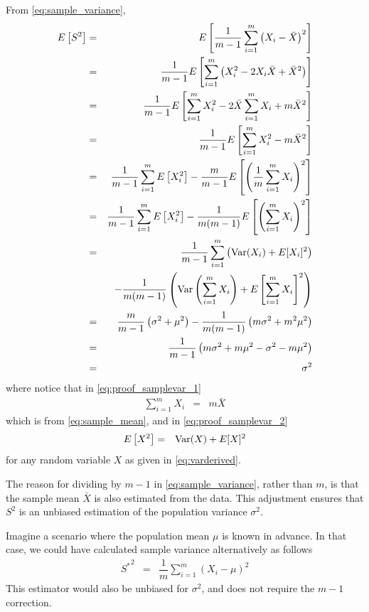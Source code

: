 From \eqref{eq:sample_variance},
\begin{eqnarray}
	E\left[S^2\right] &=& E\left[\dfrac{1}{m-1}\sum_{i=1}^{m}\left(X_i - \bar{X}\right)^2\right] \nonumber \\
	&=& \dfrac{1}{m-1} E\left[\sum_{i=1}^{m}\left(X_i^2 - 2X_i\bar{X} + \bar{X}^2\right)\right]  \nonumber \\
	&=& \dfrac{1}{m-1} E\left[\sum_{i=1}^{m}X_i^2 - 2\bar{X}\sum_{i=1}^{m}X_i + m\bar{X}^2\right] \label{eq:proof_samplevar_1} \\
	&=& \dfrac{1}{m-1} E\left[\sum_{i=1}^{m}X_i^2 - m\bar{X}^2\right] \nonumber \\
	&=& \dfrac{1}{m-1}\sum_{i=1}^{m} E\left[X_i^2\right] - \dfrac{m}{m-1}E\left[\left(\dfrac{1}{m}\sum_{i=1}^{m}X_i\right)^2\right] \nonumber \\
	&=& \dfrac{1}{m-1}\sum_{i=1}^{m} E\left[X_i^2\right] - \dfrac{1}{m(m-1)}E\left[\left(\sum_{i=1}^{m}X_i\right)^2\right] \label{eq:proof_samplevar_2} \\
	&=& \dfrac{1}{m-1}\sum_{i=1}^{m} \left(\textup{Var}(X_i) + E[X_i]^2\right) \nonumber \\ && -  \dfrac{1}{m(m-1)}\left(\textup{Var}\left(\sum_{i=1}^{m}X_i\right) + E\left[\sum_{i=1}^{m}X_i\right]^2\right) \nonumber \\
	&=& \dfrac{m}{m-1}\left(\sigma^2 + \mu^2\right) - \dfrac{1}{m(m-1)}\left(m\sigma^2 + m^2\mu^2\right) \nonumber \\
	&=& \dfrac{1}{m-1}\left(m\sigma^2 + m\mu^2 - \sigma^2 - m\mu^2\right) \nonumber \\
	&=& \sigma^2 \nonumber
\end{eqnarray}
where notice that in \eqref{eq:proof_samplevar_1} 
\begin{eqnarray}
	\sum_{i=1}^{m}X_i &=& m\bar{X} \nonumber
\end{eqnarray}
which is from \eqref{eq:sample_mean}, and in \eqref{eq:proof_samplevar_2}
\begin{eqnarray}
	E\left[X^2\right] &=& \textup{Var}(X) + E[X]^2 \nonumber
\end{eqnarray}
for any random variable $X$ as given in \eqref{eq:varderived}.

The reason for dividing by $m-1$ in \eqref{eq:sample_variance}, rather than $m$, is that the sample mean $\bar{X}$ is also estimated from the data. This adjustment ensures that $S^2$ is an unbiased estimation of the population variance $\sigma^2$.

Imagine a scenario where the population mean $\mu$ is known in advance. In that case, we could have calculated sample variance alternatively as follows
\begin{eqnarray}
	{S^*}^2 &=& \dfrac{1}{m}\sum_{i=1}^{m}\left(X_i - \mu\right)^2 \nonumber
\end{eqnarray}
This estimator would also be unbiased for $\sigma^2$, and does not require the $m-1$ correction.

